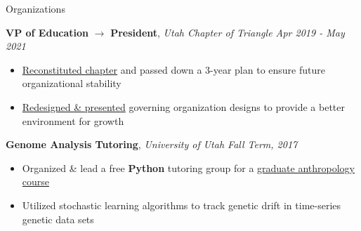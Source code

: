 \documentclass{resume/resume}
\begin{document}
\begin{rSection}{Organizations}

    {\bf VP of Education} $\rightarrow$ {\bf President}, {\em Utah Chapter of Triangle \hfill Apr 2019 - May 2021}
    \vspace{-6pt}
    \begin{itemize}[nosep]
    
        \item \href{https://github.com/UtahTriangle/Laws}{Reconstituted chapter} and passed down a 3-year plan to ensure future organizational stability
        \item \href{https://github.com/UtahTriangle/Laws/raw/main/Proposals/IGC/The\%20Independent\%20Greek\%20Council.pdf}{Redesigned \& presented} governing organization designs to provide a better environment for growth
        
    \end{itemize}
    
    
    
    {\bf Genome Analysis Tutoring}, {\em University of Utah \hfill Fall Term, 2017}
    \vspace{-6pt}
    \begin{itemize}[nosep]
      \item Organized \& lead a free {\bf Python} tutoring group for a \href{http://content.csbs.utah.edu/~rogers/ant5221/lab/manual.pdf}{graduate anthropology course}
      \item Utilized stochastic learning algorithms to track genetic drift in time-series genetic data sets
    \end{itemize}

\end{rSection}
\end{document}
